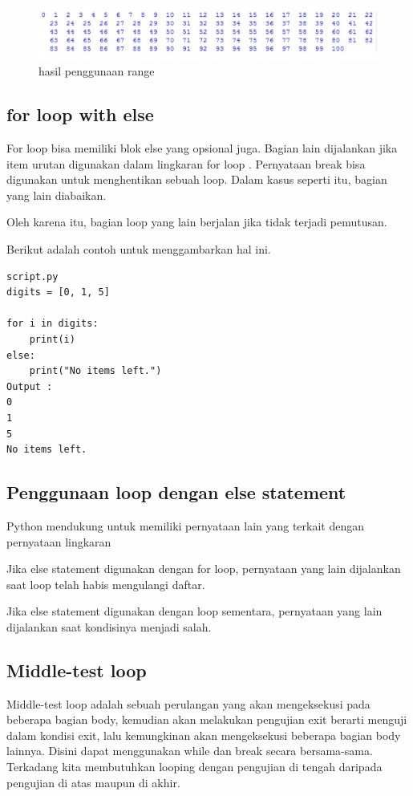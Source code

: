 \begin{figure}[ht]
    \centerline{\includegraphics[width=1\textwidth]{figures/2range3.JPG}}
    \caption{hasil penggunaan range}
    \label{2range3}
    \end{figure}

\subsection{for loop with else}
For loop bisa memiliki blok else yang opsional juga. Bagian lain dijalankan jika item urutan digunakan dalam lingkaran for loop .
Pernyataan break bisa digunakan untuk menghentikan sebuah loop. Dalam kasus seperti itu, bagian yang lain diabaikan.

Oleh karena itu, bagian loop yang lain berjalan jika tidak terjadi pemutusan.

Berikut adalah contoh untuk menggambarkan hal ini.
\begin{verbatim}
script.py 
digits = [0, 1, 5]

for i in digits:
    print(i)
else:
    print("No items left.")
Output :
0
1
5
No items left.
\end{verbatim}

\subsection{Penggunaan loop dengan else statement}
Python mendukung untuk memiliki pernyataan lain yang terkait dengan pernyataan lingkaran

Jika else statement digunakan dengan for loop, pernyataan yang lain dijalankan saat loop telah habis mengulangi daftar.

Jika else statement digunakan dengan loop sementara, pernyataan yang lain dijalankan saat kondisinya menjadi salah.

\subsection{Middle-test loop}
Middle-test loop adalah sebuah perulangan yang akan mengeksekusi pada beberapa bagian body, kemudian akan melakukan pengujian exit berarti menguji dalam kondisi exit, lalu kemungkinan akan mengeksekusi beberapa bagian body lainnya. Disini dapat menggunakan while dan break secara bersama-sama. Terkadang kita membutuhkan looping dengan pengujian di tengah daripada pengujian di atas maupun di akhir.

